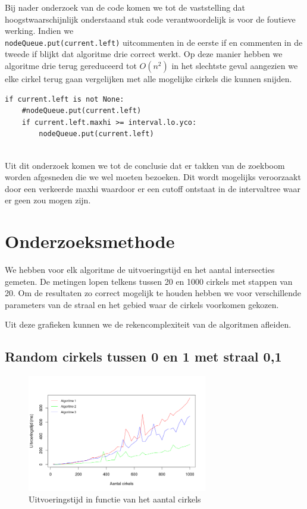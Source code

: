 \documentclass[11pt,a4paper]{article}
\begin{document}
Bij nader onderzoek van de code komen we tot de vaststelling dat hoogstwaarschijnlijk onderstaand stuk code verantwoordelijk is voor de foutieve werking. Indien we \\ \verb|nodeQueue.put(current.left)| uitcommenten in de eerste if en commenten in de tweede if blijkt dat algoritme drie correct werkt. Op deze manier hebben we algoritme drie terug gereduceerd tot $O(n^{2})$ in het slechtste geval aangezien we elke cirkel terug gaan vergelijken met alle mogelijke cirkels die kunnen snijden.

\begin{verbatim}
if current.left is not None:
    #nodeQueue.put(current.left)
    if current.left.maxhi >= interval.lo.yco:
        nodeQueue.put(current.left)
                
\end{verbatim}
Uit dit onderzoek komen we tot de conclusie dat er takken van de zoekboom worden afgesneden die we wel moeten bezoeken. Dit wordt mogelijks veroorzaakt door een verkeerde maxhi waardoor er een cutoff ontstaat in de intervaltree waar er geen zou mogen zijn.

\section{Onderzoeksmethode}

We hebben voor elk algoritme de uitvoeringstijd en het aantal intersecties gemeten. De metingen lopen telkens tussen 20 en 1000 cirkels met stappen van 20. Om de resultaten zo correct mogelijk te houden hebben we voor verschillende parameters van de straal en het gebied waar de cirkels voorkomen gekozen.

Uit deze grafieken kunnen we de rekencomplexiteit van de algoritmen afleiden.

\subsection{Random cirkels tussen 0 en 1 met straal 0,1}
\begin{figure}[H]
\centering
\includegraphics[width=0.7\textwidth]{uitvoeringstijd_01.png}
\caption*{Uitvoeringstijd in functie van het aantal cirkels}
\end{figure}
\end{document}
